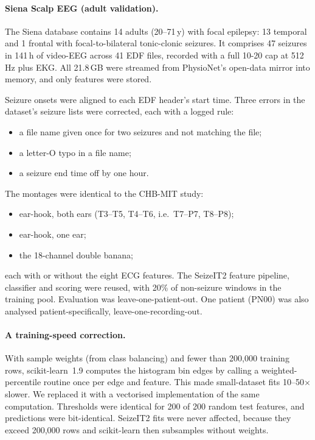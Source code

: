 \paragraph{Siena Scalp EEG (adult validation).} The Siena database \cite{detti2020,goldberger2000} contains 14 adults (20--71\,y) with focal epilepsy: 13 temporal and 1 frontal with focal-to-bilateral tonic-clonic seizures. It comprises 47 seizures in 141\,h of video-EEG across 41 EDF files, recorded with a full 10-20 cap at 512\,Hz plus EKG. All 21.8\,GB were streamed from PhysioNet's open-data mirror into memory, and only features were stored.

Seizure onsets were aligned to each EDF header's start time. Three errors in the dataset's seizure lists were corrected, each with a logged rule:
\begin{itemize}
\item a file name given once for two seizures and not matching the file;
\item a letter-O typo in a file name;
\item a seizure end time off by one hour.
\end{itemize}
The montages were identical to the CHB-MIT study:
\begin{itemize}
\item ear-hook, both ears (T3--T5, T4--T6, i.e.\ T7--P7, T8--P8);
\item ear-hook, one ear;
\item the 18-channel double banana;
\end{itemize}
each with or without the eight ECG features. The SeizeIT2 feature pipeline, classifier and scoring were reused, with 20\% of non-seizure windows in the training pool. Evaluation was leave-one-patient-out. One patient (PN00) was also analysed patient-specifically, leave-one-recording-out.

\paragraph{A training-speed correction.} With sample weights (from class balancing) and fewer than 200,000 training rows, scikit-learn~1.9 computes the histogram bin edges by calling a weighted-percentile routine once per edge and feature. This made small-dataset fits 10--50$\times$ slower. We replaced it with a vectorised implementation of the same computation. Thresholds were identical for 200 of 200 random test features, and predictions were bit-identical. SeizeIT2 fits were never affected, because they exceed 200,000 rows and scikit-learn then subsamples without weights.

